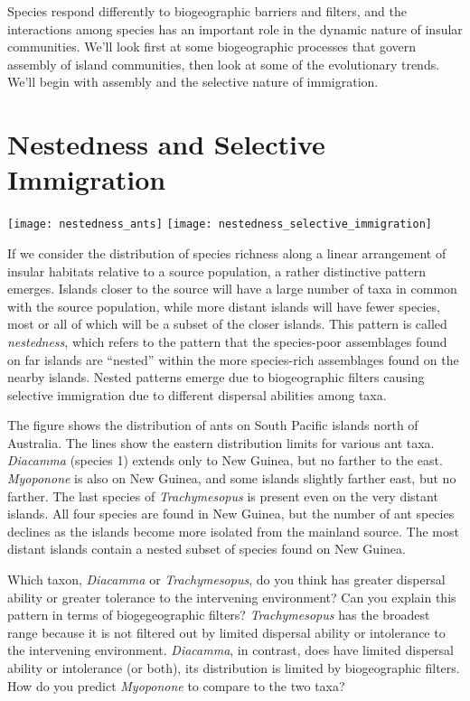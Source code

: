 \documentclass{tufte-handout}
\begin{document}
Species respond differently to biogeographic barriers and filters, and the interactions among species has an important role in the dynamic nature of insular communities.  We'll look first at some biogeographic processes that govern assembly of island communities, then look at some of the evolutionary trends.  We'll begin with assembly and the selective nature of immigration.

\section{Nestedness and Selective Immigration}
\begin{marginfigure}%
	\texttt{[image: nestedness\_ants]}
	\texttt{[image: nestedness\_selective\_immigration]}
\end{marginfigure} 

If we consider the distribution of species richness along a linear arrangement of insular habitats relative to a source population, a rather distinctive pattern emerges. Islands closer to the source will have a large number of taxa in common with the source population, while more distant islands will have fewer species, most or all of which will be a subset of the closer islands. This pattern is called \textit{nestedness}, which refers to the pattern that the species-poor assemblages found on far islands are ``nested'' within the more species-rich assemblages found on the nearby islands. Nested patterns emerge due to biogeographic filters causing selective immigration due to different dispersal abilities among taxa.

The figure shows the distribution of ants on South Pacific islands north of Australia.  The lines show the eastern distribution limits for various ant taxa.  \textit{Diacamma} (species 1) extends only to New Guinea, but no farther to the east.  \textit{Myoponone} is also on New Guinea, and some islands slightly farther east, but no farther.  The last species of \textit{Trachymesopus} is present even on the very distant islands. All four species are found in New Guinea, but the number of ant species declines as the islands become more isolated from the mainland source.  The most distant islands contain a nested subset of species found on New Guinea.   

Which taxon, \textit{Diacamma} or \textit{Trachymesopus}, do you think has greater dispersal ability or greater tolerance to the intervening environment? Can you explain this pattern in terms of biogegeographic filters? \textit{Trachymesopus} has the broadest range because it is not filtered out by limited dispersal ability or intolerance to the intervening environment.  \textit{Diacamma}, in contrast, does have limited dispersal ability or intolerance (or both), its distribution is limited by biogeographic filters.  How do you predict \textit{Myoponone} to compare to the two taxa? 
\end{document}
